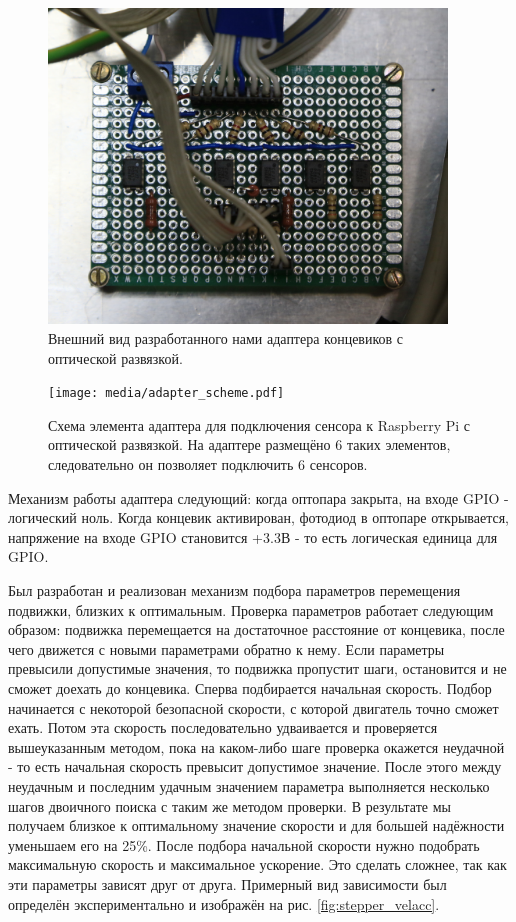 \documentclass[14pt,russian,a4paper]{extarticle}
\newcounter{subsubsubsection}[subsubsection]
\begin{document}
\begin{figure}[h!]
    \centerline{\includegraphics[width=300pt]{media/adapter.jpg}}
    \caption{Внешний вид разработанного нами адаптера концевиков с оптической развязкой.}
    \label{fig:adapter}
\end{figure}

\begin{figure}[h!]
    \centerline{\texttt{[image: media/adapter\_scheme.pdf]}}
    \caption{Схема элемента адаптера для подключения сенсора к Raspberry Pi с оптической развязкой. На адаптере размещёно 6 таких элементов, следовательно он позволяет подключить 6 сенсоров.}
    \label{fig:adapter_circuit}
\end{figure}

Механизм работы адаптера следующий: когда оптопара закрыта, на входе GPIO - логический ноль. Когда концевик активирован, фотодиод в оптопаре открывается, напряжение на входе GPIO становится +3.3В - то есть логическая единица для GPIO.

Был разработан и реализован механизм подбора параметров перемещения подвижки, близких к оптимальным. Проверка параметров работает следующим образом: подвижка перемещается на достаточное расстояние от концевика, после чего движется с новыми параметрами обратно к нему. Если параметры превысили допустимые значения, то подвижка пропустит шаги, остановится и не сможет доехать до концевика. Сперва подбирается начальная скорость. Подбор начинается с некоторой безопасной скорости, с которой двигатель точно сможет ехать. Потом эта скорость последовательно удваивается и проверяется вышеуказанным методом, пока на каком-либо шаге проверка окажется неудачной - то есть начальная скорость превысит допустимое значение. После этого между неудачным и последним удачным значением параметра выполняется несколько шагов двоичного поиска с таким же методом проверки. В результате мы получаем близкое к оптимальному значение скорости и для большей надёжности уменьшаем его на 25\%. После подбора начальной скорости нужно подобрать максимальную скорость и максимальное ускорение. Это сделать сложнее, так как эти параметры зависят друг от друга. Примерный вид зависимости был определён экспериментально и изображён на рис. \ref{fig:stepper_velacc}.
\newline
\end{document}
